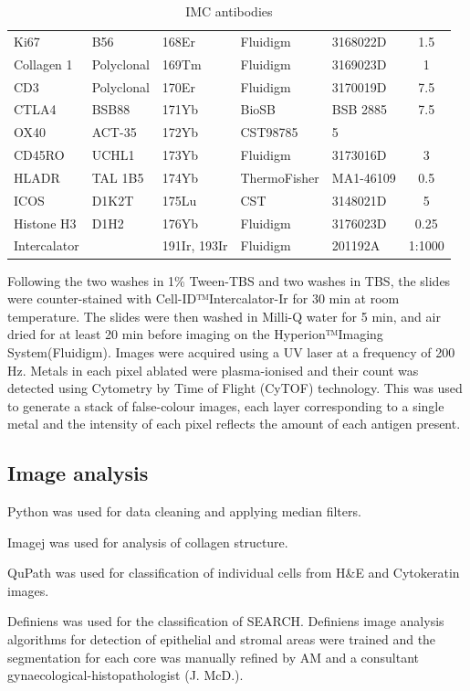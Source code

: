 \begin{table}[]
\begin{tabular}{lllllc}
    Ki67 & B56 & 168Er & Fluidigm & 3168022D & 1.5\\
    Collagen 1 & Polyclonal & 169Tm & Fluidigm & 3169023D & 1\\
    CD3 & Polyclonal & 170Er & Fluidigm & 3170019D & 7.5\\
    CTLA4 & BSB88 & 171Yb & BioSB & BSB 2885 & 7.5\\
    OX40 & ACT-35 & 172Yb & CST98785 & 5\\
    CD45RO & UCHL1 & 173Yb & Fluidigm & 3173016D & 3\\
    HLADR & TAL 1B5 & 174Yb & ThermoFisher & MA1-46109  & 0.5\\
    ICOS & D1K2T & 175Lu & CST & 3148021D & 5\\
    Histone H3 & D1H2 & 176Yb & Fluidigm & 3176023D & 0.25\\
    Intercalator &  & 191Ir, 193Ir  & Fluidigm  & 201192A & 1:1000\\
    \hline
    \end{tabular}
    \caption{IMC antibodies}
    \label{table:imc_antibodies}
\end{table}
Following the two washes in 1\% Tween-TBS and two washes in TBS, the slides were counter-stained with Cell-ID™Intercalator-Ir for 30 min at room temperature. The slides were then washed in Milli-Q water for 5 min, and air dried for at least 20 min before imaging on the Hyperion™Imaging System(Fluidigm). Images were acquired using a UV laser at a frequency of 200 Hz. Metals in each pixel ablated were plasma-ionised and their count was detected using Cytometry by Time of Flight (CyTOF) technology. This was used to generate a stack of false-colour images, each layer corresponding to a single metal and the intensity of each pixel reflects the amount of each antigen present. 

\subsection{Image analysis}
Python was used for data cleaning and applying median filters.

Imagej was used for analysis of collagen structure.

QuPath was used for classification of individual cells from H&E and Cytokeratin images.

Definiens was used for the classification of SEARCH.  Definiens image analysis algorithms for detection of epithelial and stromal areas were trained and the segmentation for each core was manually refined by AM and a consultant gynaecological-histopathologist (J. McD.).

